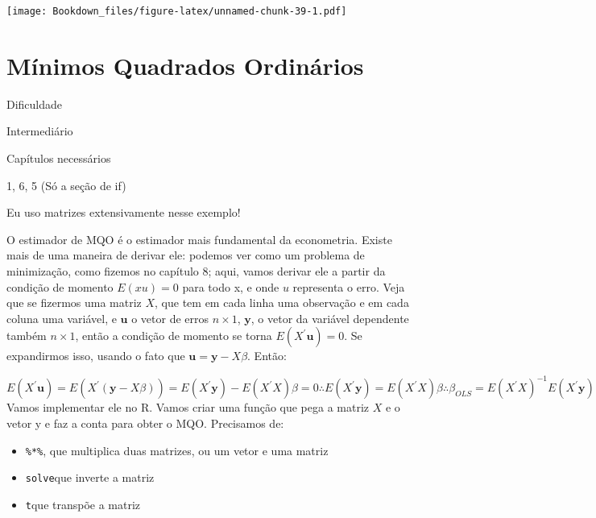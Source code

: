 \documentclass[]{book}
\newenvironment{Shaded}{\begin{snugshade}}{\end{snugshade}}
\newcommand{\KeywordTok}[1]{\textcolor[rgb]{0.13,0.29,0.53}{\textbf{#1}}}
\newcommand{\DecValTok}[1]{\textcolor[rgb]{0.00,0.00,0.81}{#1}}
\newcommand{\StringTok}[1]{\textcolor[rgb]{0.31,0.60,0.02}{#1}}
\newcommand{\ControlFlowTok}[1]{\textcolor[rgb]{0.13,0.29,0.53}{\textbf{#1}}}
\newcommand{\OperatorTok}[1]{\textcolor[rgb]{0.81,0.36,0.00}{\textbf{#1}}}
\newcommand{\NormalTok}[1]{#1}
\providecommand{\tightlist}{%
  \setlength{\itemsep}{0pt}\setlength{\parskip}{0pt}}
\begin{document}
\texttt{[image: Bookdown\_files/figure-latex/unnamed-chunk-39-1.pdf]}

\section{Mínimos Quadrados
Ordinários}\label{minimos-quadrados-ordinarios-1}

Dificuldade

Intermediário

Capítulos necessários

1, 6, 5 (Só a seção de if)

Eu uso matrizes extensivamente nesse exemplo!

O estimador de MQO é o estimador mais fundamental da econometria. Existe
mais de uma maneira de derivar ele: podemos ver como um problema de
minimização, como fizemos no capítulo 8; aqui, vamos derivar ele a
partir da condição de momento \(E(xu) = 0\) para todo x, e onde \(u\)
representa o erro. Veja que se fizermos uma matriz \(X\), que tem em
cada linha uma observação e em cada coluna uma variável, e
\(\mathbf{u}\) o vetor de erros \(n \times{} 1\), \(\mathbf{y}\), o
vetor da variável dependente também \(n \times{} 1\), então a condição
de momento se torna \(E(X^{'}\mathbf{u})=0\). Se expandirmos isso,
usando o fato que \(\mathbf{u} = \mathbf{y}-X\beta\). Então:

\[E(X^{'}\mathbf{u})=E(X^{'}(\mathbf{y}-X\beta))=E(X^{'}\mathbf{y})-E(X^{'}X)\beta = 0 \therefore E(X^{'}\mathbf{y})=E(X^{'}X)\beta \therefore \beta_{OLS} = E(X^{'}X)^{-1}E(X^{'}\mathbf{y})\]
Vamos implementar ele no R. Vamos criar uma função que pega a matriz
\(X\) e o vetor y e faz a conta para obter o MQO. Precisamos de:

\begin{itemize}
\tightlist
\item
  \texttt{\%*\%}, que multiplica duas matrizes, ou um vetor e uma matriz
\item
  \texttt{solve}que inverte a matriz
\item
  \texttt{t}que transpõe a matriz
\end{itemize}

\begin{Shaded}
\end{Shaded}
\end{document}
